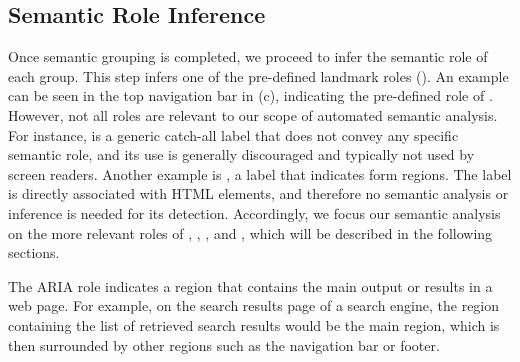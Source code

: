 \subsection{Semantic Role Inference}\label{sec:role-inf}
Once semantic grouping is completed, we proceed to infer 
the semantic role of each group. 
This step infers one of the pre-defined landmark roles (). 
An example can be seen in the top navigation bar in (c), 
indicating the pre-defined role of . 
However, not all roles are relevant to our scope of automated 
semantic analysis. For instance,  is a generic catch-all label that 
does not convey any specific semantic role, and its use is generally discouraged 
and typically not used by screen readers. 
Another example is , a label that indicates form regions. 
The label is directly associated with HTML  elements, 
and therefore no semantic analysis or inference is needed for its detection.
Accordingly, we focus our semantic analysis on the more relevant roles of 
, , , and , 
which will be described in the following sections. 


The  ARIA role indicates a region that contains the main output or results 
in a web page. For example, on the search results page of a search engine, 
the region containing the list of retrieved search results would be the main region, 
which is then surrounded by other regions such as the navigation bar or footer.

